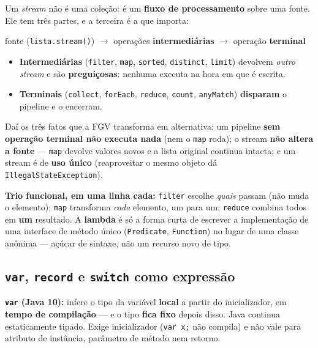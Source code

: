 \begin{conceito}
Um \emph{stream} não é uma coleção: é um \textbf{fluxo de processamento} sobre
uma fonte. Ele tem três partes, e a terceira é a que importa:

\begin{center}
fonte (\texttt{lista.stream()}) $\to$ operações \textbf{intermediárias} $\to$
operação \textbf{terminal}
\end{center}

\begin{itemize}
\item \textbf{Intermediárias} (\texttt{filter}, \texttt{map},
\texttt{sorted}, \texttt{distinct}, \texttt{limit}) devolvem \emph{outro
stream} e são \textbf{preguiçosas}: nenhuma executa na hora em que é escrita.
\item \textbf{Terminais} (\texttt{collect}, \texttt{forEach},
\texttt{reduce}, \texttt{count}, \texttt{anyMatch}) \textbf{disparam} o
pipeline e o encerram.
\end{itemize}

Daí os três fatos que a FGV transforma em alternativa: um pipeline
\textbf{sem operação terminal não executa nada} (nem o \texttt{map} roda); o
stream \textbf{não altera a fonte} --- \texttt{map} devolve valores novos e a
lista original continua intacta; e um stream é de \textbf{uso único}
(reaproveitar o mesmo objeto dá \texttt{IllegalStateException}).

\textbf{Trio funcional, em uma linha cada:} \texttt{filter} escolhe
\emph{quais} passam (não muda o elemento); \texttt{map} transforma \emph{cada}
elemento, um para um; \texttt{reduce} combina todos em \textbf{um} resultado.
A \textbf{lambda} é só a forma curta de escrever a implementação de uma
interface de método único (\texttt{Predicate}, \texttt{Function}) no lugar de
uma classe anônima --- açúcar de sintaxe, não um recurso novo de tipo.
\end{conceito}

\subsection{\texttt{var}, \texttt{record} e \texttt{switch} como expressão}

\textbf{\texttt{var} (Java 10):} infere o tipo da variável \textbf{local} a
partir do inicializador, em \textbf{tempo de compilação} --- e o tipo
\textbf{fica fixo} depois disso. Java continua estaticamente tipado. Exige
inicializador (\texttt{var x;} não compila) e não vale para atributo de
instância, parâmetro de método nem retorno.


